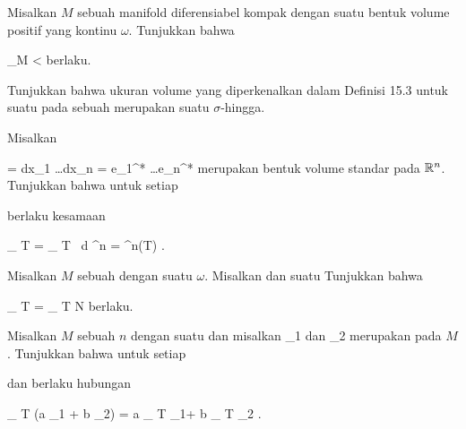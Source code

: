 \setcounter{section}{15}


{}
{

Misalkan $M$ sebuah manifold diferensiabel kompak dengan suatu bentuk volume positif yang kontinu $\omega$. Tunjukkan bahwa

\mavergleichskettedisp
{\vergleichskette
{ \int_M \omega
}
{ <} { \infty
}
{ } {
}
{ } {
}
{ } {
}
}
{}{}{}
berlaku.

}
{} {}

{}
{

Tunjukkan bahwa ukuran volume yang diperkenalkan dalam
Definisi 15.3
untuk suatu
pada sebuah
merupakan suatu
$\sigma$-hingga.

}
{} {}

{}
{

Misalkan

\mavergleichskettedisp
{\vergleichskette
{ \omega
}
{ =} { dx_1 \wedge \ldots \wedge dx_n
}
{ =} { e_1^* \wedge \ldots \wedge e_n^*
}
{ } {
}
{ } {
}
}
{}{}{}
merupakan bentuk volume standar pada ${\mathbb R}^n$. Tunjukkan bahwa untuk setiap

 berlaku kesamaan

\mavergleichskettedisp
{\vergleichskette
{
\int_{ T  }   \omega
}
{ =} { \int_{  T  }     \,  d  \lambda^n
}
{ =} { \lambda^n(T)
}
{ } {
}
{ } {
}
}
{}{}{.}

}
{} {}

{}
{

Misalkan $M$ sebuah
dengan suatu
$\omega$. Misalkan
dan
 suatu
Tunjukkan bahwa

\mavergleichskettedisp
{\vergleichskette
{
\int_{ T  }   \omega
}
{ =} {
\int_{ T \setminus N  }   \omega
}
{ } {
}
{ } {
}
{ } {
}
}
{}{}{}
berlaku.

}
{} {}

{}
{

Misalkan $M$ sebuah
 $n$
dengan suatu
dan misalkan
\mathkor {} {\omega_1} {dan} {\omega_2} {}
merupakan
pada $M$. Tunjukkan bahwa untuk setiap

 dan
 berlaku hubungan

\mavergleichskettedisp
{\vergleichskette
{
\int_{ T  }  (a \omega_1 + b \omega_2)
}
{ =} { a
\int_{  T  }   \omega_1+ b
\int_{  T  }   \omega_2
}
{ } {
}
{ } {
}
{ } {
}
}
{}{}{.}

}
{} {}

